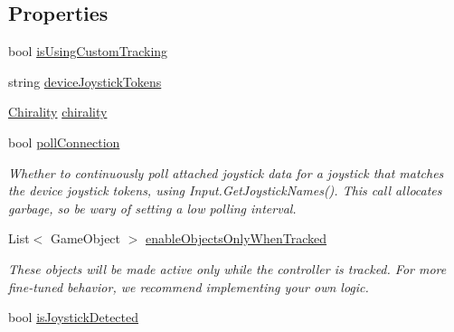\subsection*{Properties}
\begin{DoxyCompactItemize}
\item 
bool \mbox{\hyperlink{class_leap_1_1_unity_1_1_interaction_1_1_interaction_x_r_controller_a621446c06cfa8391f7f0d8990d885bf5}{is\+Using\+Custom\+Tracking}}
\item 
string \mbox{\hyperlink{class_leap_1_1_unity_1_1_interaction_1_1_interaction_x_r_controller_ac3f3ac7b791e70390c8ba9a547162525}{device\+Joystick\+Tokens}}
\item 
\mbox{\hyperlink{namespace_leap_1_1_unity_a4d15adcf20ba121b2cd9c07f503b606f}{Chirality}} \mbox{\hyperlink{class_leap_1_1_unity_1_1_interaction_1_1_interaction_x_r_controller_a84e32cb318c25dbb329b6766c6f895f8}{chirality}}
\item 
bool \mbox{\hyperlink{class_leap_1_1_unity_1_1_interaction_1_1_interaction_x_r_controller_a96ffe3a41a49ca69c3e15de4badbb98b}{poll\+Connection}}
\begin{DoxyCompactList}\small\item\em Whether to continuously poll attached joystick data for a joystick that matches the device joystick tokens, using Input.\+Get\+Joystick\+Names(). This call allocates garbage, so be wary of setting a low polling interval. \end{DoxyCompactList}\item 
List$<$ Game\+Object $>$ \mbox{\hyperlink{class_leap_1_1_unity_1_1_interaction_1_1_interaction_x_r_controller_a0cf4a1150ff9575affb5532f1e252b6a}{enable\+Objects\+Only\+When\+Tracked}}
\begin{DoxyCompactList}\small\item\em These objects will be made active only while the controller is tracked. For more fine-\/tuned behavior, we recommend implementing your own logic. \end{DoxyCompactList}\item 
bool \mbox{\hyperlink{class_leap_1_1_unity_1_1_interaction_1_1_interaction_x_r_controller_ac017dcb1298c729f9cc46f24aeeb6a00}{is\+Joystick\+Detected}}

\end{DoxyCompactItemize}
